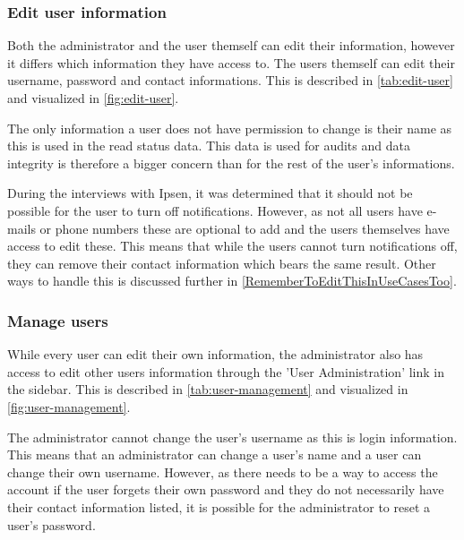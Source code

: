 \subsubsection{Edit user information}
Both the administrator and the user themself can edit their information, however it differs which information they have access to.
The users themself can edit their username, password and contact informations.
This is described in \cref{tab:edit-user} and visualized in \cref{fig:edit-user}.




The only information a user does not have permission to change is their name as this is used in the read status data.
This data is used for audits and data integrity is therefore a bigger concern than for the rest of the user's informations.

During the interviews with Ipsen, it was determined that it should not be possible for the user to turn off notifications.
However, as not all users have e-mails or phone numbers these are optional to add and the users themselves have access to edit these.
This means that while the users cannot turn notifications off, they can remove their contact information which bears the same result. 
Other ways to handle this is discussed further in \cref{RememberToEditThisInUseCasesToo}.

\subsubsection{Manage users}
While every user can edit their own information, the administrator also has access to edit other users information through the 'User Administration' link in the sidebar.
This is described in \cref{tab:user-management} and visualized in \cref{fig:user-management}.




The administrator cannot change the user's username as this is login information.
This means that an administrator can change a user's name and a user can change their own username.
However, as there needs to be a way to access the account if the user forgets their own password and they do not necessarily have their contact information listed, it is possible for the administrator to reset a user's password.

